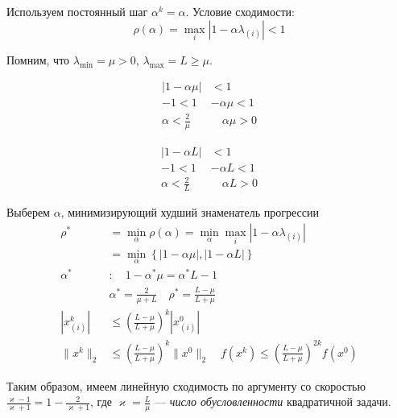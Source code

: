 \documentclass[
  russian,
  letterpaper,
  DIV=11,
  numbers=noendperiod]{scrartcl}
\begin{document}
Используем постоянный шаг \(\alpha^k = \alpha\). Условие сходимости: \[
\rho(\alpha) = \max_{i} |1 - \alpha \lambda_{(i)}| < 1
\]

Помним, что \(\lambda_{\min} = \mu > 0\),
\(\lambda_{\max} = L \geq \mu\).

\[
\begin{split}
|1 - \alpha \mu| &< 1 \\ 
 -1 < 1 &- \alpha \mu < 1 \\ 
 \alpha < \tfrac{2}{\mu} \quad & \quad \alpha\mu > 0
\end{split}
\]

\[
\begin{split}
|1 - \alpha L| &< 1 \\ 
 -1 < 1 &- \alpha L < 1 \\ 
 \alpha < \tfrac{2}{L} \quad & \quad \alpha L > 0
\end{split}
\]

Выберем \(\alpha\), минимизирующий худший знаменатель прогрессии \[
\begin{split}
\rho^* &=  \min_{\alpha} \rho(\alpha)   = \min_{\alpha} \max_{i} |1 - \alpha \lambda_{(i)}| \\ 
 &=  \min_{\alpha} \left\{|1 - \alpha \mu|, |1 - \alpha L| \right\} \\ 
\alpha^* &: \quad  1 - \alpha^* \mu = \alpha^* L - 1 \\ 
 & \alpha^* = \frac{2}{\mu + L}  \quad \rho^* = \frac{L - \mu}{L + \mu} \\ 
 |x^{k}_{(i)}| &\leq \left( \frac{L - \mu}{L + \mu} \right)^k |x^0_{(i)}| \\
 \|x^{k}\|_2 &\leq \left( \frac{L - \mu}{L + \mu} \right)^k \|x^0\|_2  \quad f(x^{k}) \leq \left( \frac{L - \mu}{L + \mu} \right)^{2k} f(x^0)
\end{split}
\]

Таким образом, имеем линейную сходимость по аргументу со скоростью
\(\frac{\varkappa - 1}{\varkappa + 1} = 1 - \frac{2}{\varkappa + 1}\),
где \(\varkappa = \frac{L}{\mu}\) --- \emph{число обусловленности}
квадратичной задачи.
\end{document}
